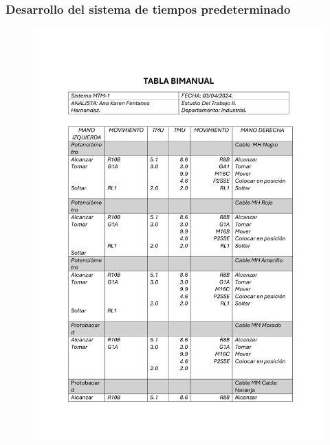     \subsubsection{Desarrollo del sistema de tiempos predeterminado}
    \begin{figure}[H]
        \centering
        \includegraphics[trim = {40mm 60mm 20mm 21mm},clip,scale=0.35]{9/Img/tablaMtmUno.pdf}
        \label{fig:Mtm}
    \end{figure}
